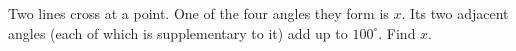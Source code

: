Two lines cross at a point. One of the four angles they form is $x$. Its two adjacent angles (each of which is supplementary to it) add up to $100^\circ$. Find $x$.

